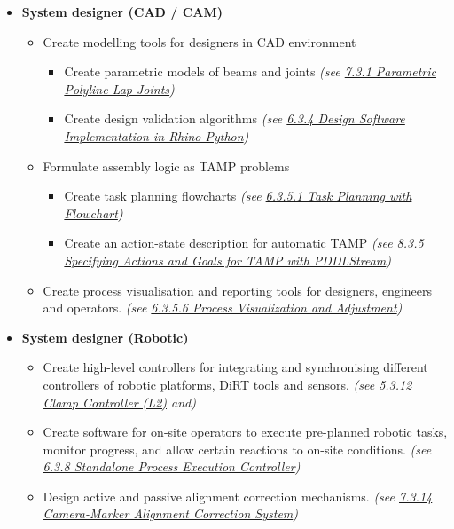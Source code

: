 \documentclass[11pt]{book}
\begin{document}
\begin{itemize}
	\item \textbf{System designer (CAD / CAM)}

\begin{itemize}
	\item Create modelling tools for designers in CAD environment 

\begin{itemize}
	\item Create parametric models of beams and joints \textit{(see \uline{7.3.1 Parametric Polyline Lap Joints})}

	\item Create design validation algorithms \textit{(see \uline{6.3.4 Design Software Implementation in Rhino Python})}

\end{itemize}
	\item Formulate assembly logic as TAMP problems

\begin{itemize}
	\item Create task planning flowcharts \textit{(see \uline{6.3.5.1 Task Planning with Flowchart})}

	\item Create an action-state description for automatic TAMP \textit{(see \uline{8.3.5 Specifying Actions and Goals for TAMP with PDDLStream})}

\end{itemize}
	\item Create process visualisation and reporting tools for designers, engineers and operators. \textit{(see \uline{6.3.5.6 Process Visualization and Adjustment})}

\end{itemize}
	\item \textbf{System designer (Robotic)}

\begin{itemize}
	\item Create high-level controllers for integrating and synchronising different controllers of robotic platforms, DiRT tools and sensors. \textit{(see \uline{5.3.12 Clamp Controller (L2)} and)}

	\item Create software for on-site operators to execute pre-planned robotic tasks, monitor progress, and allow certain reactions to on-site conditions. \textit{(see \uline{6.3.8 Standalone Process Execution Controller})}

	\item Design active and passive alignment correction mechanisms. \textit{(see \uline{7.3.14 Camera-Marker Alignment Correction System})}


\end{itemize}
\end{itemize}
\end{document}

